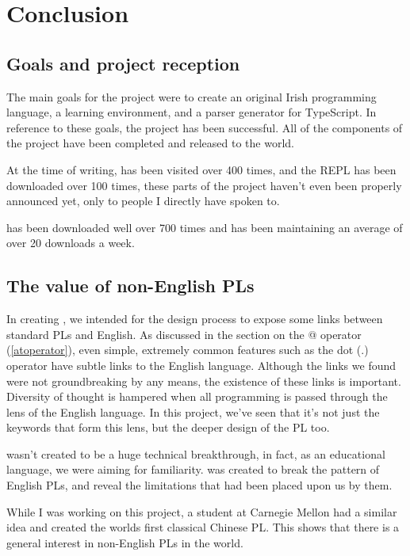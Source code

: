 \chapter{Conclusion}

\section{Goals and project reception}
The main goals for the project were to create an original Irish programming language, a learning environment, and a parser generator for TypeScript. In reference to these goals, the project has been successful. All of the components of the project have been completed and released to the world.

At the time of writing, \trys{} has been visited over 400 times, and the \Setanta{} REPL has been downloaded over 100 times, these parts of the project haven't even been properly announced yet, only to people I directly have spoken to.

\tsPEG{} has been downloaded well over 700 times and has been maintaining an average of over 20 downloads a week.

\section{The value of non-English PLs}

In creating \Setanta{}, we intended for the design process to expose some links between standard PLs and English. As discussed in the section on the @ operator (\ref{atoperator}), even simple, extremely common features such as the dot (.) operator have subtle links to the English language. Although the links we found were not groundbreaking by any means, the existence of these links is important. Diversity of thought is hampered when all programming is passed through the lens of the English language. In this project, we've seen that it’s not just the keywords that form this lens, but the deeper design of the PL too.

\Setanta{} wasn't created to be a huge technical breakthrough, in fact, as an educational language, we were aiming for familiarity.
\Setanta{} was created to break the pattern of English PLs, and reveal the limitations that had been placed upon us by them.

While I was working on this project, a student at Carnegie Mellon had a similar idea and created the worlds first classical Chinese PL\cite{chinesepl}. This shows that there is a general interest in non-English PLs in the world.

